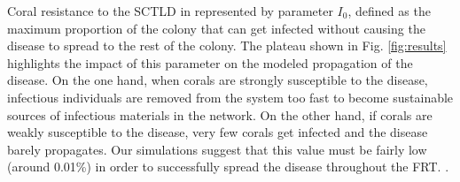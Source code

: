 \documentclass[utf8]{frontiersSCNS}
\newcommand{\dobby}[1]{\textbf{\color{violet}{#1}}}
\begin{document}

Coral resistance to the SCTLD in represented by parameter $I_0$, defined as the maximum proportion of the colony that can get infected without causing the disease to spread to the rest of the colony. The plateau shown in Fig. \ref{fig:results} highlights the impact of this parameter on the modeled propagation of the disease. On the one hand, when corals are strongly susceptible to the disease, infectious individuals are removed from the system too fast to become sustainable sources of infectious materials in the network. On the other hand, if corals are weakly susceptible to the disease, very few corals get infected and the disease barely propagates. Our simulations suggest that this value must be fairly low (around 0.01\%) in order to successfully spread the disease throughout the FRT. \dobby{This seems to imply that susceptible coral species have very weak defense mechanisms against the causative agent of the disease. (?)}.\\
\end{document}
